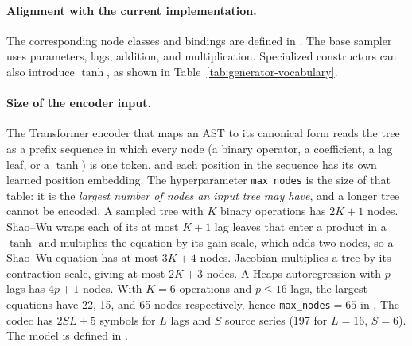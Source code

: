 \paragraph{Alignment with the current implementation.}
The corresponding node classes and bindings are defined in
. The base sampler uses
parameters, lags, addition, and multiplication. Specialized constructors can
also introduce $\tanh$, as shown in Table~\ref{tab:generator-vocabulary}.

\paragraph{Size of the encoder input.}
The Transformer encoder that maps an AST to its canonical form reads the tree
as a prefix sequence in which every node (a binary operator, a coefficient, a
lag leaf, or a $\tanh$) is one token, and each position in the sequence has its
own learned position embedding. The hyperparameter \texttt{max\_nodes} is the
size of that table: it is the \emph{largest number of nodes an input tree may
have}, and a longer tree cannot be encoded. A sampled tree with $K$ binary
operations has $2K+1$ nodes. Shao--Wu wraps each of its at most $K+1$ lag leaves
that enter a product in a $\tanh$ and multiplies the equation by its gain scale,
which adds two nodes, so a Shao--Wu equation has at most $3K+4$ nodes. Jacobian
multiplies a tree by its contraction scale, giving at most $2K+3$ nodes. A Heaps
autoregression with $p$ lags has $4p+1$ nodes. With $K=6$ operations and
$p\le16$ lags, the largest equations have 22, 15, and 65 nodes respectively, hence
\texttt{max\_nodes}${}=65$ in
. The codec has
$2SL+5$ symbols for $L$ lags and $S$ source series (197 for $L=16$, $S=6$). The
model is defined in
.

